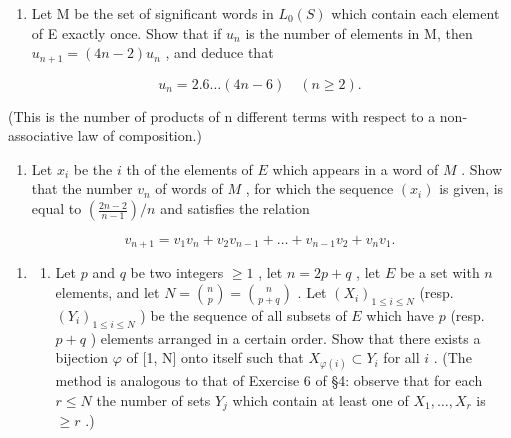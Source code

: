 \begin{enumerate}
\def\labelenumi{(\alph{enumi})}
\tightlist
\item
  Let M be the set of significant words in \(L_{0}(S)\) which contain each element of E exactly once. Show that if \(u_{n}\) is the number of elements in M, then \(u_{n+1} = (4n - 2)u_{n}\) , and deduce that
\end{enumerate}

\[
u _ {n} = 2. 6 \dots (4 n - 6) \quad (n \geqslant 2).
\]

(This is the number of products of n different terms with respect to a non-associative law of composition.)

\begin{enumerate}
\def\labelenumi{(\alph{enumi})}
\setcounter{enumi}{1}
\tightlist
\item
  Let \(x_{i}\) be the \(i\) th of the elements of \(E\) which appears in a word of \(M\) . Show that the number \(v_{n}\) of words of \(M\) , for which the sequence \((x_{i})\) is given, is equal to \((\frac{2n-2}{n-1})/n\) and satisfies the relation
\end{enumerate}

\[
v _ {n + 1} = v _ {1} v _ {n} + v _ {2} v _ {n - 1} + \dots + v _ {n - 1} v _ {2} + v _ {n} v _ {1}.
\]

\begin{enumerate}
\def\labelenumi{\arabic{enumi}.}
\setcounter{enumi}{11}
\tightlist
\item
  \begin{enumerate}
  \def\labelenumii{(\alph{enumii})}
  \tightlist
  \item
    Let \(p\) and \(q\) be two integers \(\geqslant 1\) , let \(n = 2p + q\) , let \(E\) be a set with \(n\) elements, and let \(N = \binom{n}{p} = \binom{n}{p + q}\) . Let \((X_i)_{1 \leqslant i \leqslant N}\) (resp. \((Y_i)_{1 \leqslant i \leqslant N}\) ) be the sequence of all subsets of \(E\) which have \(p\) (resp. \(p + q\) ) elements arranged in a certain order. Show that there exists a bijection \(\varphi\) of {[}1, N{]} onto itself such that \(X_{\varphi(i)} \subset Y_i\) for all \(i\) . (The method is analogous to that of Exercise 6 of §4: observe that for each \(r \leqslant N\) the number of sets \(Y_j\) which contain at least one of \(X_1, \ldots, X_r\) is \(\geqslant r\) .)
  \end{enumerate}
\end{enumerate}


